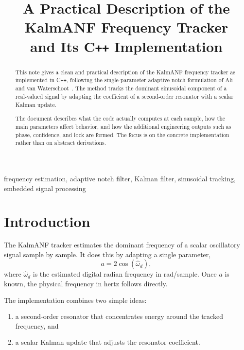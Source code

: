 \documentclass[conference]{IEEEtran}
\title{A Practical Description of the KalmANF Frequency Tracker\\
and Its C\texttt{++} Implementation}
\author{%
    \IEEEauthorblockN{Mikhail S.\ Grushinskiy}
    \IEEEauthorblockA{Independent Researcher\\
    Bareboat Necessities Project\\
    \texttt{mgrouch@users.github.com}}
}
\begin{document}
    \maketitle

    \begin{abstract}
        This note gives a clean and practical description of the KalmANF frequency
        tracker as implemented in C\texttt{++}, following the single-parameter
        adaptive notch formulation of Ali and van Waterschoot~\cite{AliWaterschoot2023}.
        The method tracks the dominant sinusoidal component of a real-valued signal by
        adapting the coefficient of a second-order resonator with a scalar Kalman
        update.

        The document describes what the code actually computes at each sample, how the
        main parameters affect behavior, and how the additional engineering outputs
        such as phase, confidence, and lock are formed. The focus is on the concrete
        implementation rather than on abstract derivations.
    \end{abstract}

    \begin{IEEEkeywords}
        frequency estimation, adaptive notch filter, Kalman filter, sinusoidal
        tracking, embedded signal processing
    \end{IEEEkeywords}

    \section{Introduction}

    The KalmANF tracker estimates the dominant frequency of a scalar oscillatory
    signal sample by sample. It does this by adapting a single parameter,
    \begin{equation}
        a = 2\cos(\hat\omega_d),
    \end{equation}
    where $\hat\omega_d$ is the estimated digital radian frequency in
    rad/sample. Once $a$ is known, the physical frequency in hertz follows
    directly.

    The implementation combines two simple ideas:
    \begin{enumerate}[leftmargin=1.5em]
        \item a second-order resonator that concentrates energy around the tracked
        frequency, and
        \item a scalar Kalman update that adjusts the resonator coefficient.
    \end{enumerate}
\end{document}
